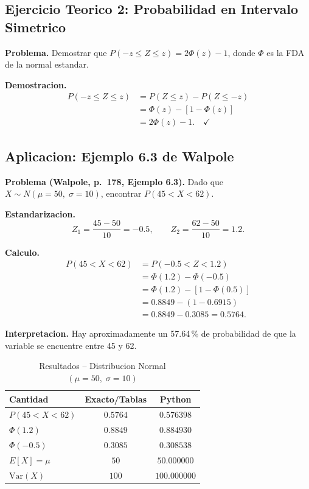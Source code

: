 \documentclass[12pt,a4paper]{article}
\begin{document}
\subsection{Ejercicio Teorico 2: Probabilidad en Intervalo Simetrico}

\textbf{Problema.} Demostrar que $P(-z\leq Z\leq z) = 2\Phi(z) - 1$,
donde $\Phi$ es la FDA de la normal estandar.

\textbf{Demostracion.}
\begin{align*}
  P(-z \leq Z \leq z) &= P(Z \leq z) - P(Z \leq -z) \\
                       &= \Phi(z) - [1 - \Phi(z)] \\
                       &= 2\Phi(z) - 1. \quad \checkmark
\end{align*}

\subsection{Aplicacion: Ejemplo 6.3 de Walpole}

\textbf{Problema (Walpole, p.\ 178, Ejemplo 6.3).}
Dado que $X \sim N(\mu = 50,\; \sigma = 10)$, encontrar $P(45 < X < 62)$.

\textbf{Estandarizacion.}
\[
  Z_1 = \frac{45 - 50}{10} = -0.5, \qquad Z_2 = \frac{62 - 50}{10} = 1.2.
\]

\textbf{Calculo.}
\begin{align*}
  P(45 < X < 62) &= P(-0.5 < Z < 1.2) \\
                  &= \Phi(1.2) - \Phi(-0.5) \\
                  &= \Phi(1.2) - [1 - \Phi(0.5)] \\
                  &= 0.8849 - (1 - 0.6915) \\
                  &= 0.8849 - 0.3085 = \mathbf{0.5764}.
\end{align*}

\textbf{Interpretacion.} Hay aproximadamente un 57.64\,\% de probabilidad de que
la variable se encuentre entre 45 y 62.

\begin{table}[H]
\centering
\caption{Resultados -- Distribucion Normal $(\mu=50,\;\sigma=10)$}
\renewcommand{\arraystretch}{1.4}
\begin{tabular}{lcc}
\toprule
\textbf{Cantidad} & \textbf{Exacto/Tablas} & \textbf{Python} \\
\midrule
$P(45 < X < 62)$  & $0.5764$  & $0.576398$ \\
$\Phi(1.2)$        & $0.8849$  & $0.884930$ \\
$\Phi(-0.5)$       & $0.3085$  & $0.308538$ \\
$E[X] = \mu$       & $50$      & $50.000000$ \\
$\mathrm{Var}(X)$  & $100$     & $100.000000$ \\
\bottomrule
\end{tabular}
\end{table}
\end{document}
